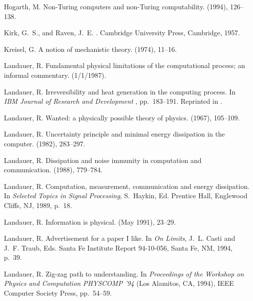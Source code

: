 \begin{thebibliography}{10}
{\sc Hogarth, M.}
\newblock Non-{T}uring computers and non-{T}uring computability.
 (1994), 126--138.

{\sc Kirk, G.~S., and Raven, J.~E.}
.
\newblock Cambridge University Press, Cambridge, 1957.

{\sc Kreisel, G.}
\newblock A notion of mechanistic theory.
 (1974), 11--16.

{\sc Landauer, R.}
\newblock Fundamental physical limitations of the computational process; an
  informal commentary.
 (1/1/1987).

{\sc Landauer, R.}
\newblock Irreversibility and heat generation in the computing process.
\newblock In {\em IBM Journal of Research and Development\/}
  \cite{maxwell-demon}, pp.~183--191.
\newblock Reprinted in \cite[pp. 188-196]{maxwell-demon}.

{\sc Landauer, R.}
\newblock Wanted: a physically possible theory of physics.
 (1967), 105--109.

{\sc Landauer, R.}
\newblock Uncertainty principle and minimal energy dissipation in the computer.
 (1982),
  283--297.

{\sc Landauer, R.}
\newblock Dissipation and noise immunity in computation and communication.
 (1988), 779--784.

{\sc Landauer, R.}
\newblock Computation, measurement, communication and energy dissipation.
\newblock In {\em Selected Topics in Signal Processing}, S.~Haykin, Ed.
  Prentice Hall, Englewood Cliffs, NJ, 1989, p.~18.

{\sc Landauer, R.}
\newblock Information is physical.
 (May 1991), 23--29.

{\sc Landauer, R.}
\newblock Advertisement for a paper {I} like.
\newblock In {\em On Limits}, J.~L. Casti and J.~F. Traub, Eds. Santa Fe
  Institute Report 94-10-056, Santa Fe, NM, 1994, p.~39.

{\sc Landauer, R.}
\newblock Zig-zag path to understanding.
\newblock In {\em Proceedings of the Workshop on Physics and Computation
  PHYSCOMP '94\/} (Los Alamitos, CA, 1994), IEEE Computer Society Press,
  pp.~54--59.


\end{thebibliography}
